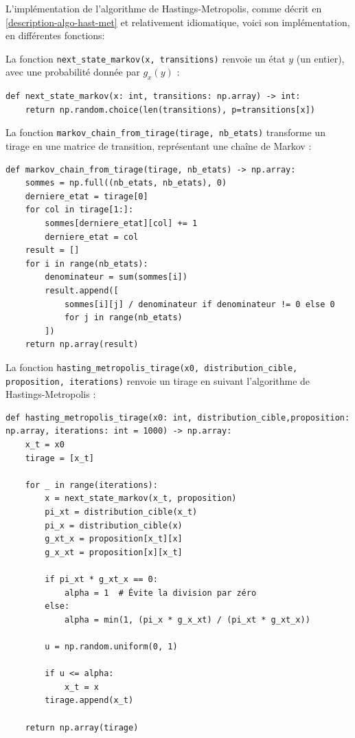 \documentclass{article}
\begin{document}
L’implémentation de l’algorithme de Hastings-Metropolis, comme décrit en \ref{description-algo-hast-met} et relativement idiomatique, voici son implémentation, en différentes fonctions: 

La fonction \texttt{next\_state\_markov(x, transitions)} renvoie un état $y$ (un entier), avec une probabilité donnée par $g_x(y)$ :

\begin{verbatim}
def next_state_markov(x: int, transitions: np.array) -> int:
    return np.random.choice(len(transitions), p=transitions[x])
\end{verbatim}

La fonction \texttt{markov\_chain\_from\_tirage(tirage, nb\_etats)} transforme un tirage en une matrice de transition, représentant une chaîne de Markov :

\begin{verbatim}
def markov_chain_from_tirage(tirage, nb_etats) -> np.array:
    sommes = np.full((nb_etats, nb_etats), 0)
    derniere_etat = tirage[0]
    for col in tirage[1:]:
        sommes[derniere_etat][col] += 1
        derniere_etat = col
    result = []
    for i in range(nb_etats):
        denominateur = sum(sommes[i])
        result.append([
            sommes[i][j] / denominateur if denominateur != 0 else 0 
            for j in range(nb_etats)
        ])
    return np.array(result)
\end{verbatim}

La fonction \texttt{hasting\_metropolis\_tirage(x0, distribution\_cible, proposition, iterations)} renvoie un tirage en suivant l’algorithme de Hastings-Metropolis :

\begin{verbatim}
def hasting_metropolis_tirage(x0: int, distribution_cible,proposition: np.array, iterations: int = 1000) -> np.array:
    x_t = x0
    tirage = [x_t]

    for _ in range(iterations):
        x = next_state_markov(x_t, proposition)
        pi_xt = distribution_cible(x_t)
        pi_x = distribution_cible(x)
        g_xt_x = proposition[x_t][x]
        g_x_xt = proposition[x][x_t]

        if pi_xt * g_xt_x == 0:
            alpha = 1  # Évite la division par zéro
        else:
            alpha = min(1, (pi_x * g_x_xt) / (pi_xt * g_xt_x))

        u = np.random.uniform(0, 1)

        if u <= alpha:
            x_t = x
        tirage.append(x_t)

    return np.array(tirage)
\end{verbatim}
\end{document}
